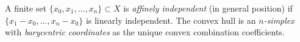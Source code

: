 A finite set $\{x_0, x_1, \ldots, x_n\} \subset X$ is \emph{affinely independent} (in general position) if $\{x_1-x_0, \ldots, x_n-x_0\}$ is linearly independent. The convex hull is an \emph{$n$-simplex} with \emph{barycentric coordinates} as the unique convex combination coefficients.
